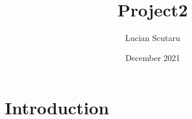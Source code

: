 \documentclass{article}
\title{Project2}
\author{Lucian Scutaru}
\date{December 2021}
\begin{document}
\maketitle

\section{Introduction}
\end{document}
